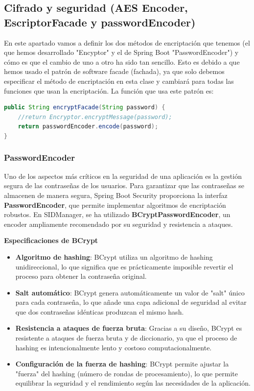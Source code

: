 \documentclass[draft]{scrbook}
\begin{document}
\subsection{ Cifrado y seguridad (AES Encoder, EscriptorFacade y passwordEncoder) }
\label{subsec:cryptography}
En este apartado vamos a definir los dos métodos de encriptación que tenemos (el que hemos desarrollado "Encyptor" y el de Spring Boot "PasswordEncoder") y cómo es que el cambio de uno a otro ha sido tan sencillo. Esto es debido a que hemos usado el patrón de software facade (fachada), ya que solo debemos especificar el método de encriptación en esta clase y cambiará para todas las funciones que usan la encriptación. La función que usa este patrón es:

\begin{lstlisting}[language=java]
public String encryptFacade(String password) {
    //return Encryptor.encryptMessage(password);
    return passwordEncoder.encode(password);
}
\end{lstlisting}

\subsubsection{ PasswordEncoder }
\label{subsec:password-encoder}

Uno de los aspectos más críticos en la seguridad de una aplicación es la gestión segura de las contraseñas de los usuarios. Para garantizar que las contraseñas se almacenen de manera segura, Spring Boot Security proporciona la interfaz \textbf{PasswordEncoder}, que permite implementar algoritmos de encriptación robustos. En SIDManager, se ha utilizado \textbf{BCryptPasswordEncoder}, un encoder ampliamente recomendado por su seguridad y resistencia a ataques.

\textbf{Especificaciones de BCrypt}

\begin{itemize}
    \item \textbf{Algoritmo de hashing}: BCrypt utiliza un algoritmo de hashing unidireccional, lo que significa que es prácticamente imposible revertir el proceso para obtener la contraseña original.
    \item \textbf{Salt automático}: BCrypt genera automáticamente un valor de "salt" único para cada contraseña, lo que añade una capa adicional de seguridad al evitar que dos contraseñas idénticas produzcan el mismo hash.
    \item \textbf{Resistencia a ataques de fuerza bruta}: Gracias a su diseño, BCrypt es resistente a ataques de fuerza bruta y de diccionario, ya que el proceso de hashing es intencionalmente lento y costoso computacionalmente.
    \item \textbf{Configuración de la fuerza de hashing}: BCrypt permite ajustar la "fuerza" del hashing (número de rondas de procesamiento), lo que permite equilibrar la seguridad y el rendimiento según las necesidades de la aplicación.
\end{itemize}
\end{document}
